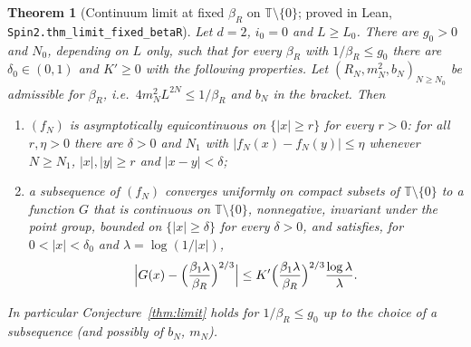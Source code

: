 \documentclass[11pt]{amsart}
\newtheorem{theorem}{Theorem}[section]
\theoremstyle{definition}
\theoremstyle{remark}
\numberwithin{equation}{section}
\newcommand{\T}{\mathbb{T}}
\begin{document}
\begin{theorem}[Continuum limit at fixed $\beta_R$ on $\T\setminus\{0\}$; proved in Lean, \texttt{Spin2.thm\_limit\_fixed\_betaR}]\label{thm:limit-fixed}
Let $d=2$, $i_0=0$ and $L\ge L_0$. There are $g_0>0$ and $N_0$, depending on $L$ only, such that for every $\beta_R$
with $1/\beta_R\le g_0$ there are $\delta_0\in(0,1)$ and $K'\ge0$ with the following properties. Let
$(R_N,m_N^2,b_N)_{N\ge N_0}$ be admissible for $\beta_R$, i.e.\ $4m_N^2L^{2N}\le1/\beta_R$ and $b_N$ in the bracket. Then
\begin{enumerate}[label=(\alph*)]
\item $(f_N)$ is asymptotically equicontinuous on $\{|x|\ge r\}$ for every $r>0$: for all $r,\eta>0$ there are
$\delta>0$ and $N_1$ with $|f_N(x)-f_N(y)|\le\eta$ whenever $N\ge N_1$, $|x|,|y|\ge r$ and $|x-y|<\delta$;
\item a subsequence of $(f_N)$ converges uniformly on compact subsets of $\T\setminus\{0\}$ to a function $G$ that is
continuous on $\T\setminus\{0\}$, nonnegative, invariant under the point group, bounded on $\{|x|\ge\delta\}$ for every
$\delta>0$, and satisfies, for $0<|x|<\delta_0$ and $\lambda=\log(1/|x|)$,
\[
\Bigl|G(x)-\Bigl(\frac{\beta_1\lambda}{\beta_R}\Bigr)^{2/3}\Bigr|\le K'\Bigl(\frac{\beta_1\lambda}{\beta_R}\Bigr)^{2/3}\frac{\log\lambda}{\lambda}.
\]
\end{enumerate}
In particular Conjecture~\ref{thm:limit} holds for $1/\beta_R\le g_0$ up to the choice of a subsequence (and possibly
of $b_N$, $m_N$).
\end{theorem}
\end{document}
